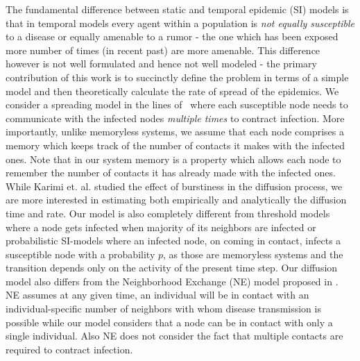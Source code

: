 The fundamental difference between static and temporal epidemic (SI) models is that in temporal models every agent  within a population is {\em not equally susceptible} to a disease or equally amenable to a rumor
 - the one which has been exposed more number of times (in recent past) are more amenable. This difference however is not well formulated and hence not well modeled - the primary contribution of this work 
is to succinctly define the problem in  terms of a simple model and then theoretically calculate the rate of spread of the epidemics. 
We consider a spreading model in the lines of~\cite{takaguchi2013bursty} where each susceptible node needs to communicate with the 
infected nodes {\em multiple times} to contract infection. More importantly, unlike memoryless systems, we assume that each node comprises a memory which 
keeps track of the number of contacts it makes with the infected ones. Note that in our system memory is a property which allows each node to remember the number 
of contacts it has already made with the infected ones. While Karimi et. al. studied the effect of burstiness in the diffusion process, we 
are more interested in estimating both empirically and analytically the diffusion time and rate.
Our model is also completely different from  threshold models~\cite{granovetter1978threshold,sur1} where a node
 gets infected when majority of its neighbors are infected or probabilistic SI-models where an infected node,  on coming in contact, 
infects a susceptible node with a probability $p$,  as those are memoryless systems and the transition depends only on the activity of the present time step. 
Our diffusion model also differs from the Neighborhood Exchange (NE) model proposed in \cite{volz2007susceptible}. NE assumes at any given time, an individual
will be in contact with an individual-specific number of neighbors with whom disease transmission is possible while our model considers that a node can be in contact with 
only a single individual. Also NE does not consider the fact that multiple contacts are required to contract infection.

